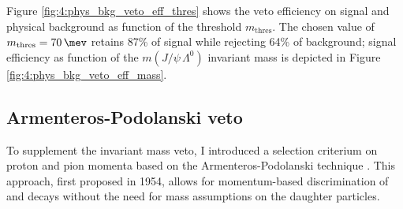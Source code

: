 Figure \ref{fig:4:phys_bkg_veto_eff_thres} shows the veto efficiency on \demonstratorshort signal and \physbkgshort physical background as function of the threshold $m_\text{thres}$.
The chosen value of $m_\text{thres} = \SI{70}{\mev}$ retains 87\% of signal while rejecting 64\% of background;
signal efficiency as function of the $m(J/\psi\,\Lambda^0)$ invariant mass is depicted in Figure \ref{fig:4:phys_bkg_veto_eff_mass}.

\subsection{Armenteros-Podolanski veto}
To supplement the invariant mass veto, I introduced a selection criterium on proton and pion momenta based on the Armenteros-Podolanski technique \cite{armenteros-podolanski}.
This approach, first proposed in 1954, allows for momentum-based discrimination of \lambdadecay and \kshortdecay decays without the need for mass assumptions on the daughter particles.

